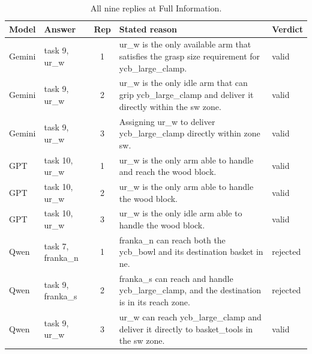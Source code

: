 \begin{table}[H]
\centering
\caption{All nine replies at Full Information.}
\label{tab:appendix:replies}
\begin{tabular}{llcp{}l}
\toprule
Model & Answer & Rep & Stated reason & Verdict \\
\midrule
Gemini & task 9, ur\_w & 1 & ur\_w is the only available arm that satisfies the grasp size requirement for ycb\_large\_clamp. & valid \\
Gemini & task 9, ur\_w & 2 & ur\_w is the only idle arm that can grip ycb\_large\_clamp and deliver it directly within the sw zone. & valid \\
Gemini & task 9, ur\_w & 3 & Assigning ur\_w to deliver ycb\_large\_clamp directly within zone sw. & valid \\
GPT & task 10, ur\_w & 1 & ur\_w is the only arm able to handle and reach the wood block. & valid \\
GPT & task 10, ur\_w & 2 & ur\_w is the only arm able to handle the wood block. & valid \\
GPT & task 10, ur\_w & 3 & ur\_w is the only idle arm able to handle the wood block. & valid \\
Qwen & task 7, franka\_n & 1 & franka\_n can reach both the ycb\_bowl and its destination basket in ne. & rejected \\
Qwen & task 9, franka\_s & 2 & franka\_s can reach and handle ycb\_large\_clamp, and the destination is in its reach zone. & rejected \\
Qwen & task 9, ur\_w & 3 & ur\_w can reach ycb\_large\_clamp and deliver it directly to basket\_tools in the sw zone. & valid \\
\bottomrule
\end{tabular}
\end{table}
